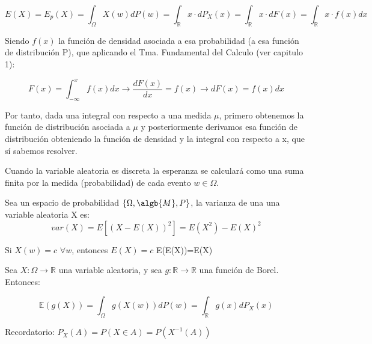 \documentclass{apuntes}
\begin{document}
\begin{defn}
\[
E(X)=E_p(X)=\int_{\Omega}X(w)dP(w) = \int_{\mathbb{R}}x\cdot dP_X(x)= \int_{\mathbb{R}}x\cdot dF(x) = \int_{\mathbb{R}}x\cdot f(x) dx
\]

Siendo $f(x)$ la función de densidad asociada a esa probabilidad (a esa función de distribución P), que aplicando el Tma. Fundamental del Calculo (ver capitulo 1):

\[
F(x) = \int_{-\infty}^{x}f(x)dx  \rightarrow \frac{dF(x)}{dx}= f(x) \rightarrow dF(x) = f(x)dx
\]

Por tanto, dada una integral con respecto a una medida $\mu$, primero obtenemos la función de distribución asociada a $\mu$ y posteriormente derivamos esa función de distribución obteniendo la función de densidad y la integral con respecto a x, que sí sabemos resolver.

Cuando la variable aleatoria es discreta la esperanza se calculará como una suma finita por la medida (probabilidad) de cada evento $w \in \Omega$.

\end{defn}


\begin{defn}[Varianza]
Sea un espacio de probabilidad $\{\Omega, \algb{M},P\}$, la varianza de una una variable aleatoria X es:
\[
var(X)=E[(X-E(X))^2] = E(X^2)-E(X)^2
\]

\obs Si $X(w)=c$  $\forall w$, entonces $E(X)=c$
\obs E(E(X))=E(X)
\end{defn}

\begin{defn}
Sea $X: \Omega \rightarrow \mathbb{R}$ una variable aleatoria, y sea $g:\mathbb{R} \rightarrow \mathbb{R}$ una función de Borel. Entonces:

\[
\mathbb{E}(g(X))=\int_{\Omega}g(X(w))dP(w)=\int_{\mathbb{R}}g(x)dP_X(x)
\]

Recordatorio: $P_X(A)=P(X\in A)=P(X^{-1}(A))$
\end{defn}
\end{document}
